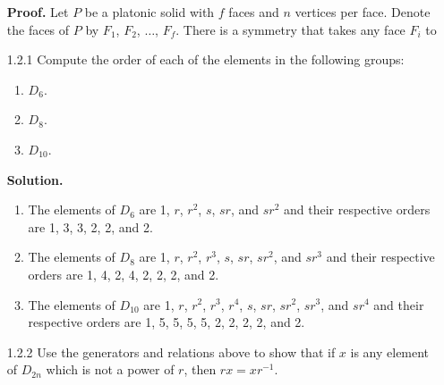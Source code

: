 \begin{enumerate}
      \textbf{Proof.} Let $P$ be a platonic solid with $f$ faces and $n$
      vertices per face. Denote the faces of $P$ by $F_1$, $F_2$, $\ldots$,
      $F_f$. There is a symmetry that takes any face $F_i$ to
   \item[1.2.1]   Compute the order of each of the elements in the following
                  groups:
                  \begin{enumerate}
                     \item $D_6$.
                     \item $D_8$.
                     \item $D_{10}$.
                  \end{enumerate}
                 
      \textbf{Solution.}
      
      \begin{enumerate}
         \item The elements of $D_6$ are 1, $r$, $r^2$, $s$, $sr$, and $sr^2$
               and their respective orders are 1, 3, 3, 2, 2, and 2.
         \item The elements of $D_8$ are 1, $r$, $r^2$, $r^3$, $s$, $sr$,
               $sr^2$, and $sr^3$ and their respective orders are 1, 4, 2, 4, 2,
               2, 2, and 2.
         \item The elements of $D_{10}$ are 1, $r$, $r^2$, $r^3$, $r^4$, $s$,
               $sr$, $sr^2$, $sr^3$, and $sr^4$ and their respective orders are
               1, 5, 5, 5, 5, 2, 2, 2, 2, and 2.
      \end{enumerate}
   \item[1.2.2]   Use the generators and relations above to show that if $x$ is
                  any element of $D_{2n}$ which is not a power of $r$, then
                  $rx = xr^{-1}$. 
                  

\end{enumerate}
